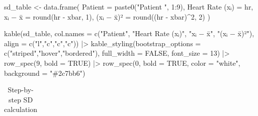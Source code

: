 \documentclass[
  12pt,
  letterpaper,
]{book}
\newenvironment{Shaded}{\begin{snugshade}}{\end{snugshade}}
\newcommand{\AttributeTok}[1]{\textcolor[rgb]{0.40,0.45,0.13}{#1}}
\newcommand{\ConstantTok}[1]{\textcolor[rgb]{0.56,0.35,0.01}{#1}}
\newcommand{\DecValTok}[1]{\textcolor[rgb]{0.68,0.00,0.00}{#1}}
\newcommand{\FunctionTok}[1]{\textcolor[rgb]{0.28,0.35,0.67}{#1}}
\newcommand{\NormalTok}[1]{\textcolor[rgb]{0.00,0.23,0.31}{#1}}
\newcommand{\OtherTok}[1]{\textcolor[rgb]{0.00,0.23,0.31}{#1}}
\newcommand{\SpecialCharTok}[1]{\textcolor[rgb]{0.37,0.37,0.37}{#1}}
\newcommand{\StringTok}[1]{\textcolor[rgb]{0.13,0.47,0.30}{#1}}
\begin{document}
\begin{tcolorbox}
\begin{Shaded}
\begin{Highlighting}[]
\NormalTok{sd\_table }\OtherTok{\textless{}{-}} \FunctionTok{data.frame}\NormalTok{(}
  \StringTok{\textasciigrave{}}\AttributeTok{Patient}\StringTok{\textasciigrave{}} \OtherTok{=} \FunctionTok{paste0}\NormalTok{(}\StringTok{"Patient "}\NormalTok{, }\DecValTok{1}\SpecialCharTok{:}\DecValTok{9}\NormalTok{),}
  \StringTok{\textasciigrave{}}\AttributeTok{Heart Rate (xᵢ)}\StringTok{\textasciigrave{}} \OtherTok{=}\NormalTok{ hr,}
  \StringTok{\textasciigrave{}}\AttributeTok{xᵢ − x̄}\StringTok{\textasciigrave{}} \OtherTok{=} \FunctionTok{round}\NormalTok{(hr }\SpecialCharTok{{-}}\NormalTok{ xbar, }\DecValTok{1}\NormalTok{),}
  \StringTok{\textasciigrave{}}\AttributeTok{(xᵢ − x̄)²}\StringTok{\textasciigrave{}} \OtherTok{=} \FunctionTok{round}\NormalTok{((hr }\SpecialCharTok{{-}}\NormalTok{ xbar)}\SpecialCharTok{\^{}}\DecValTok{2}\NormalTok{, }\DecValTok{2}\NormalTok{)}
\NormalTok{)}

\FunctionTok{kable}\NormalTok{(sd\_table,}
      \AttributeTok{col.names =} \FunctionTok{c}\NormalTok{(}\StringTok{"Patient"}\NormalTok{, }\StringTok{"Heart Rate (xᵢ)"}\NormalTok{, }\StringTok{"xᵢ − x̄"}\NormalTok{, }\StringTok{"(xᵢ − x̄)²"}\NormalTok{),}
      \AttributeTok{align =} \FunctionTok{c}\NormalTok{(}\StringTok{"l"}\NormalTok{,}\StringTok{"c"}\NormalTok{,}\StringTok{"c"}\NormalTok{,}\StringTok{"c"}\NormalTok{)) }\SpecialCharTok{|\textgreater{}}
  \FunctionTok{kable\_styling}\NormalTok{(}\AttributeTok{bootstrap\_options =} \FunctionTok{c}\NormalTok{(}\StringTok{"striped"}\NormalTok{,}\StringTok{"hover"}\NormalTok{,}\StringTok{"bordered"}\NormalTok{),}
                \AttributeTok{full\_width =} \ConstantTok{FALSE}\NormalTok{, }\AttributeTok{font\_size =} \DecValTok{13}\NormalTok{) }\SpecialCharTok{|\textgreater{}}
  \FunctionTok{row\_spec}\NormalTok{(}\DecValTok{9}\NormalTok{, }\AttributeTok{bold =} \ConstantTok{TRUE}\NormalTok{) }\SpecialCharTok{|\textgreater{}}
  \FunctionTok{row\_spec}\NormalTok{(}\DecValTok{0}\NormalTok{, }\AttributeTok{bold =} \ConstantTok{TRUE}\NormalTok{, }\AttributeTok{color =} \StringTok{"white"}\NormalTok{, }\AttributeTok{background =} \StringTok{"\#2c7bb6"}\NormalTok{)}
\end{Highlighting}
\end{Shaded}

\begingroup\fontsize{13}{15}\selectfont

\begin{longtable}[t]{lccc}

\caption{\label{tbl-sd-calc}Step-by-step SD calculation}

\tabularnewline


\end{longtable}
\end{tcolorbox}
\end{document}
